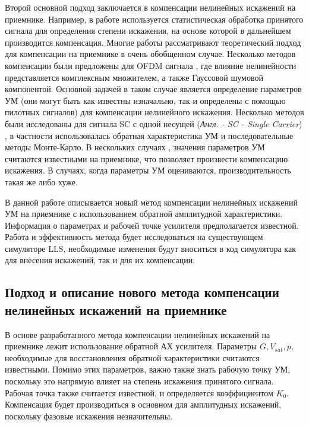 Второй основной подход заключается в компенсации нелинейных искажений на
приемнике. Например, в работе \cite{maltsev2021} используется
статистическая обработка принятого сигнала для определения степени
искажения, на основе которой в дальнейшем производится компенсация. Многие
работы \cite[]{sharath2015, shabany2008,bhat2016,qi2010,gregorio2007,
bouhadda2015,drotar2010} рассматривают теоретический подход для компенсации
на приемнике в очень обобщенном случае. Несколько методов компенсации были
предложены для OFDM сигнала \cite[]{gregorio2007,bouhadda2015, drotar2010},
где влияние нелинейности представляется комплексным множителем, а также
Гауссовой шумовой компонентой. Основной задачей в таком случае является
определение параметров УМ (они могут быть как известны изначально, так и
определены с помощью пилотных сигналов) для компенсации нелинейного
искажения. Несколько методов были исследованы для сигнала SC с одной несущей
(\textit{Англ. - SC - Single Carrier}) \cite[]{sharath2015,
shabany2008,bhat2016, qi2010}, в частности использовалась обратная
характеристика УМ и последовательные методы Монте-Карло. В нескольких
случаях \cite[]{bhat2016, qi2010,gregorio2007}, значения параметров УМ
считаются известными на приемнике, что позволяет произвести компенсацию
искажения. В случаях, когда параметры УМ оцениваются, производительность
такая же либо хуже.

В данной работе описывается новый метод компенсации нелинейных искажений УМ на
приемнике с использованием обратной амплитудной характеристики. Информация
о параметрах и рабочей точке усилителя предполагается известной. Работа и
эффективность метода будет исследоваться на существующем симуляторе
LLS, необходимые изменения будут вноситься в код симулятора
как для внесения искажений, так и для их компенсации.







\subsection{Подход и описание нового метода компенсации
нелинейных искажений на приемнике} В основе разработанного метода
компенсации нелинейных искажений на приемнике лежит использование обратной
АХ усилителя. Параметры $G, V_{sat}, p$, необходимые для восстановления
обратной характеристики считаются известными. Помимо этих параметров, важно
также знать рабочую точку УМ, поскольку это напрямую влияет на степень
искажения принятого сигнала. Рабочая точка также считается известной, и
определяется коэффициентом $K_0$. Компенсация будет производиться в
основном для амплитудных искажений, поскольку фазовые искажения
незначительны.

